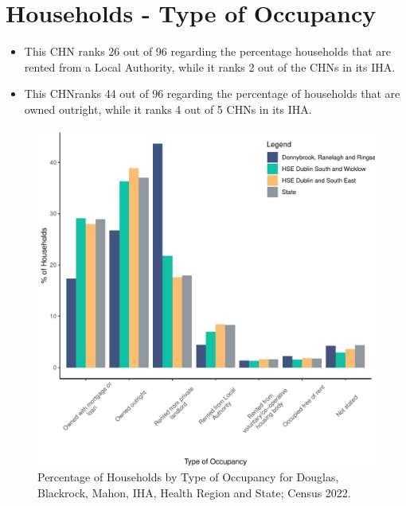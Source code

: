 \documentclass{article}
\begin{document}
\section{Households - Type of Occupancy}\label{sect:Households}
\begin{itemize}
\item This CHN ranks  26 out of 96 regarding the percentage households that are rented from a Local Authority, while it ranks  2 out of the CHNs in its IHA. 
\item This CHNranks  44 out of 96 regarding the percentage of households that are owned outright, while it ranks   4 out of 5 CHNs in its IHA.
\end{itemize}
\begin{figure}[H]
	\centering
	\includegraphics[width = 140mm]{../figures/HouseholdsED.pdf}
	\caption{Percentage of Households by Type of Occupancy for Douglas, Blackrock, Mahon, IHA, Health Region and State; Census 2022.}
	\label{fig:vbnv}
	\end{figure}
\end{document}
